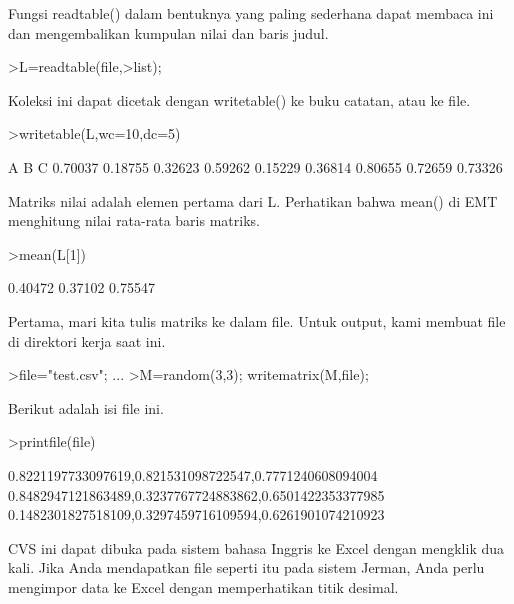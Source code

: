 \documentclass[a4paper,10pt]{article}
\begin{document}
\begin{eulernotebook}
\begin{eulercomment}
\begin{eulercomment}
\begin{eulercomment}
\begin{eulercomment}
\begin{eulercomment}
\begin{eulercomment}
\begin{euleroutput}
\end{euleroutput}
\begin{eulercomment}
Fungsi readtable() dalam bentuknya yang paling sederhana dapat membaca
ini dan mengembalikan kumpulan nilai dan baris judul.
\end{eulercomment}
\begin{eulerprompt}
>L=readtable(file,>list);
\end{eulerprompt}
\begin{eulercomment}
Koleksi ini dapat dicetak dengan writetable() ke buku catatan, atau ke
file.
\end{eulercomment}
\begin{eulerprompt}
>writetable(L,wc=10,dc=5)
\end{eulerprompt}
\begin{euleroutput}
           A         B         C
     0.70037   0.18755   0.32623
     0.59262   0.15229   0.36814
     0.80655   0.72659   0.73326
\end{euleroutput}
\begin{eulercomment}
Matriks nilai adalah elemen pertama dari L. Perhatikan bahwa mean() di
EMT menghitung nilai rata-rata baris matriks.
\end{eulercomment}
\begin{eulerprompt}
>mean(L[1])
\end{eulerprompt}
\begin{euleroutput}
    0.40472 
    0.37102 
    0.75547 
\end{euleroutput}
\begin{eulercomment}
Pertama, mari kita tulis matriks ke dalam file. Untuk output, kami
membuat file di direktori kerja saat ini.
\end{eulercomment}
\begin{eulerprompt}
>file="test.csv";  ...
>M=random(3,3); writematrix(M,file);
\end{eulerprompt}
\begin{eulercomment}
Berikut adalah isi file ini.
\end{eulercomment}
\begin{eulerprompt}
>printfile(file)
\end{eulerprompt}
\begin{euleroutput}
  0.8221197733097619,0.821531098722547,0.7771240608094004
  0.8482947121863489,0.3237767724883862,0.6501422353377985
  0.1482301827518109,0.3297459716109594,0.6261901074210923
  
\end{euleroutput}
\begin{eulercomment}
CVS ini dapat dibuka pada sistem bahasa Inggris ke Excel dengan
mengklik dua kali. Jika Anda mendapatkan file seperti itu pada sistem
Jerman, Anda perlu mengimpor data ke Excel dengan memperhatikan titik
desimal.


\end{eulercomment}
\end{eulercomment}
\end{eulercomment}
\end{eulercomment}
\end{eulercomment}
\end{eulercomment}
\end{eulercomment}
\end{eulernotebook}
\end{document}
